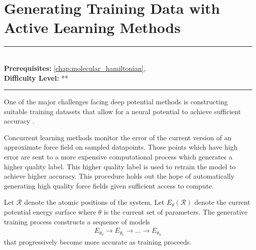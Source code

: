 \documentclass[book.tex]{subfiles}
\begin{document}
\chapter{Generating Training Data with Active Learning Methods}
\label{chap:neural_potential}
\noindent\rule{11cm}{0.4pt} \\
\textbf{Prerequisites:}  \autoref{chap:molecular_hamiltonian},   \\
\textbf{Difficulty Level:} ** \\
\noindent\rule{11cm}{0.4pt}
\vspace{5mm}



One of the major challenges facing deep potential methods is constructing suitable training datasets that allow for a neural potential to achieve sufficient accuracy \cite{zhang2020dp}. 

Concurrent learning methods monitor the error of the current version of an approximate force field on sampled datapoints. Those points which have high error are sent to a more expensive computational process which generates a higher quality label. This higher quality label is used to retrain the model to achieve higher accuracy. This procedure holds out the hope of automatically generating high quality force fields given sufficient access to compute.

Let $\mathcal{R}$ denote the atomic positions of the system. Let $E_\theta(\mathcal{R})$ denote the current potential energy surface where $\theta$ is the current set of parameters. The generative training process constructs a sequence of models
\begin{align}
    E_{\theta_0} \to E_{\theta_1} \to \dotsc \to E_{\theta_n}
\end{align}
that progressively become more accurate as training proceeds.
\end{document}

